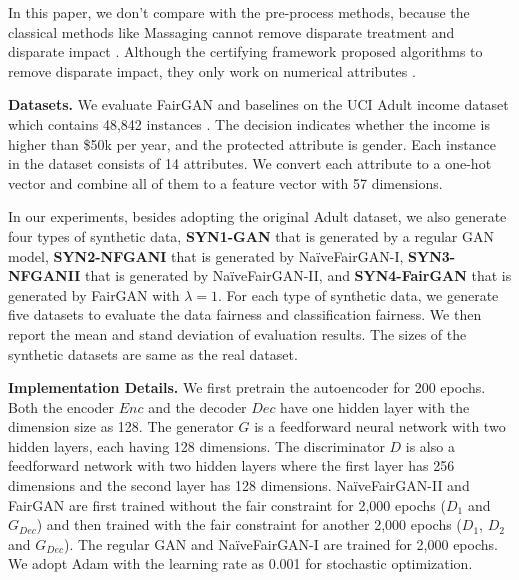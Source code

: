 \documentclass[sigconf]{acmart}
\theoremstyle{definition}
\begin{document}
In this paper, we don't compare with the pre-process methods, because the classical methods like Massaging cannot remove disparate treatment and disparate impact \cite{Kamiran2012Data}. Although the certifying framework proposed algorithms to remove disparate impact, they only work on numerical attributes \cite{Feldman2015Certifying}. 


{\bf \noindent Datasets.}
We evaluate FairGAN and baselines on the UCI Adult income dataset which contains 48,842 instances \cite{Dheeru2017Uci}. The decision indicates whether the income is higher than \$50k per year, and the protected attribute is gender. Each instance in the dataset consists of 14 attributes. We convert each attribute to a one-hot vector and combine all of them to a feature vector with 57 dimensions. 

In our experiments, besides adopting the original Adult dataset, we also generate four types of synthetic data, \textbf{SYN1-GAN} that is generated by a regular GAN model, \textbf{SYN2-NFGANI} that is generated by Na\"iveFairGAN-I, \textbf{SYN3-NFGANII} that is generated by Na\"iveFairGAN-II, and \textbf{SYN4-FairGAN} that is generated by FairGAN with $\lambda=1$. For each type of synthetic data, we generate five datasets to evaluate the data fairness and classification fairness. We then report the mean and stand deviation of evaluation results. The sizes of the synthetic datasets are same as the real dataset.

{\bf \noindent Implementation Details.}
We first pretrain the autoencoder for 200 epochs. Both the encoder $Enc$ and the decoder $Dec$ have one hidden layer with the dimension size as 128. The generator $G$ is a feedforward neural network with two hidden layers, each having 128 dimensions. The discriminator $D$ is also a feedforward network with two hidden layers where the first layer has 256 dimensions and the second layer has 128 dimensions. Na\"iveFairGAN-II and FairGAN are first trained without the fair constraint for 2,000 epochs ($D_1$ and $G_{Dec}$) and then trained with the fair constraint for another 2,000 epochs ($D_1$, $D_2$ and $G_{Dec}$). The regular GAN and Na\"iveFairGAN-I are trained for 2,000 epochs. We adopt Adam \cite{Kingma2015Adam} with the learning rate as 0.001 for stochastic optimization. 
\end{document}

